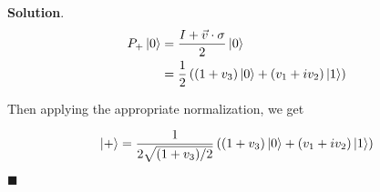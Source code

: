 \documentclass[12pt]{article}
\theoremstyle{definition}
\newenvironment{s}{%
        \begin{trivlist} \item \textbf{Solution}. }{%
            \hspace*{\fill} $\blacksquare$\end{trivlist}}%
\begin{document}
{\begin{s}
\begin{align*} 
P_{+}\ket{0} &= \frac{I+\vec{v}\cdot\sigma}{2}\ket{0}\\
&= \frac{1}{2}\left((1+v_{3})\ket{0} + (v_{1} + iv_{2})\ket{1}\right)
\end{align*}

Then applying the appropriate normalization, we get

\begin{align*} 
\ket{+} =  \frac{1}{2\sqrt{(1+v_{3})/2}}\left((1+v_{3})\ket{0} + (v_{1} + iv_{2})\ket{1}\right)
\end{align*}

\end{s}
\end{document}
